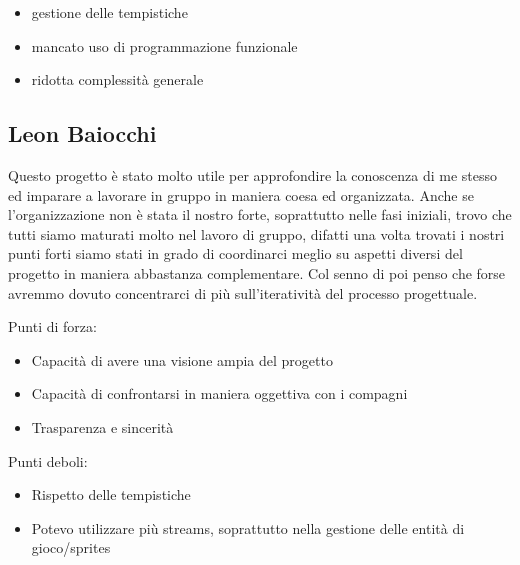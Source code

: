 \begin{itemize}
	\item gestione delle tempistiche
	\item mancato uso di programmazione funzionale
	\item ridotta complessità generale
\end{itemize}


\subsection*{Leon Baiocchi}
Questo progetto è stato molto utile per approfondire la conoscenza di me stesso ed imparare a lavorare in gruppo in maniera coesa ed organizzata. Anche se l'organizzazione non è stata il nostro forte, soprattutto nelle fasi iniziali, trovo che tutti siamo maturati molto nel lavoro di gruppo, difatti una volta trovati i nostri punti forti siamo stati in grado di coordinarci meglio su aspetti diversi del progetto in maniera abbastanza complementare. Col senno di poi penso che forse avremmo dovuto concentrarci di più sull'iteratività del processo progettuale.
\textsf{\small }

\begin{flushleft}
	
\textsf{\small Punti di forza:}\\

\begin{itemize}
	\item \textsf{\small Capacità di avere una visione ampia del progetto} 
	\item \textsf{\small Capacità di confrontarsi in maniera oggettiva con i compagni}
	\item \textsf{\small Trasparenza e sincerità}
\end{itemize}

\textsf{\small Punti deboli: }\\

\begin{itemize}
	\item \textsf{\small Rispetto delle tempistiche}
	\item \textsf{\small Potevo utilizzare più streams, soprattutto nella gestione delle entità di gioco/sprites}
\end{itemize}

\end{flushleft}


